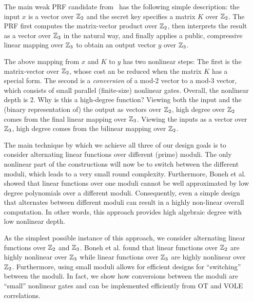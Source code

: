 The main weak PRF candidate from~\cite{boneh2018-darkmatter} has the following simple description: the input $x$ is a vector over  $\mathbb{Z}_2$ and the secret key specifies a matrix $K$ over  $\mathbb{Z}_2$. The PRF first computes the matrix-vector product over  $\mathbb{Z}_2$, then interprets the result as a vector over $\mathbb{Z}_3$ in the natural way,  and finally applies a public, compressive linear mapping over $\mathbb{Z}_3$ to obtain an output vector $y$ over $\mathbb{Z}_3$. 

The above mapping from $x$ and $K$ to $y$ has two nonlinear steps: The first is the matrix-vector over $\mathbb{Z}_2$, whose cost an be reduced when the matrix $K$ has a special form. The second is a {\em conversion} of a mod-2 vector to a mod-3 vector, which consists of small parallel (finite-size) nonlinear gates.  Overall, the nonlinear depth is 2. Why is this a high-degree function? Viewing both the input and the (binary representation of) the output as vectors over $\mathbb{Z}_2$, high degree over $\mathbb{Z}_2$ comes from the final linear mapping over $\mathbb{Z}_3$. Viewing the inputs as a vector over $\mathbb{Z}_3$, high degree comes from the bilinear mapping over $\mathbb{Z}_2$.    

The main technique by which we achieve all three of our design goals is to consider alternating linear functions over different (prime) moduli. The only nonlinear part of the constructions will now be to switch between the different moduli, which leads to a very small round complexity. Furthermore, Boneh et al.~\cite{boneh2018-darkmatter} showed that linear functions over one moduli cannot be well approximated by low degree polynomials over a different moduli. Consequently, even a simple design that alternates between different moduli can result in a highly non-linear overall computation. In other words, this approach provides high algebraic degree with low nonlinear depth. 

As the simplest possible instance of this approach, we consider alternating linear functions over $\mathbb{Z}_2$ and $\mathbb{Z}_3$. Boneh et al. found that linear functions over $\mathbb{Z}_2$ are highly nonlinear over $\mathbb{Z}_3$ while linear functions over $\mathbb{Z}_3$ are highly nonlinear over $\mathbb{Z}_2$. Furthermore, using small moduli allows for efficient designs for ``switching'' between the moduli. In fact, we show how conversions between the moduli are “small” nonlinear gates and can be implemented efficiently from OT and VOLE correlations.


